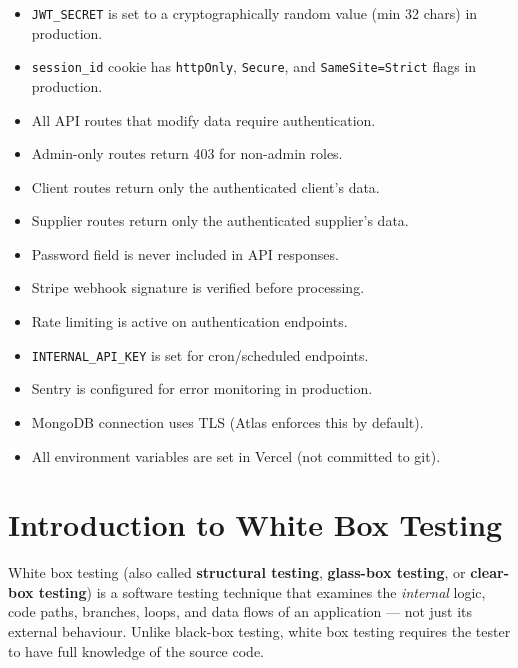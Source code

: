 \documentclass[12pt,a4paper]{report}
\begin{document}
\begin{tcolorbox}[criticalbox,title={Pre-Release Security Checklist}]
\begin{itemize}[leftmargin=1.5em]
  \item[$\square$] \texttt{JWT\_SECRET} is set to a cryptographically random value (min 32 chars) in production.
  \item[$\square$] \texttt{session\_id} cookie has \texttt{httpOnly}, \texttt{Secure}, and \texttt{SameSite=Strict} flags in production.
  \item[$\square$] All API routes that modify data require authentication.
  \item[$\square$] Admin-only routes return 403 for non-admin roles.
  \item[$\square$] Client routes return only the authenticated client's data.
  \item[$\square$] Supplier routes return only the authenticated supplier's data.
  \item[$\square$] Password field is never included in API responses.
  \item[$\square$] Stripe webhook signature is verified before processing.
  \item[$\square$] Rate limiting is active on authentication endpoints.
  \item[$\square$] \texttt{INTERNAL\_API\_KEY} is set for cron/scheduled endpoints.
  \item[$\square$] Sentry is configured for error monitoring in production.
  \item[$\square$] MongoDB connection uses TLS (Atlas enforces this by default).
  \item[$\square$] All environment variables are set in Vercel (not committed to git).
\end{itemize}
\end{tcolorbox}

\chapter{Introduction to White Box Testing}

\begin{tcolorbox}[infobox, title={What is White Box Testing?}]
White box testing (also called \textbf{structural testing}, \textbf{glass-box testing}, or
\textbf{clear-box testing}) is a software testing technique that examines the \emph{internal}
logic, code paths, branches, loops, and data flows of an application --- not just its external
behaviour. Unlike black-box testing, white box testing requires the tester to have full
knowledge of the source code.
\end{tcolorbox}
\end{document}
